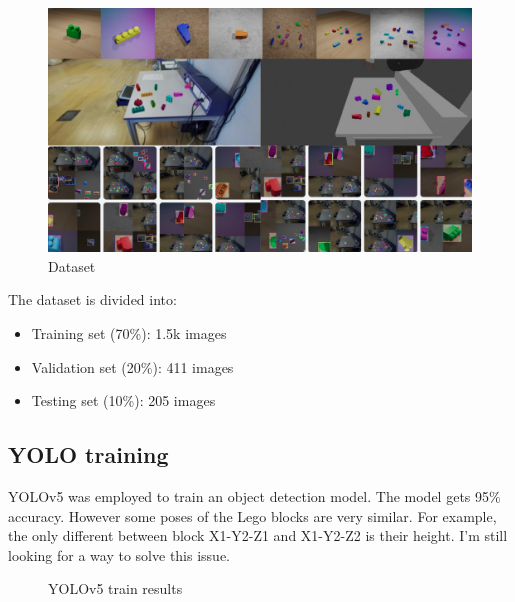 \documentclass{article}
\begin{document}
	\begin{figure}[H]
		\centering
		\includegraphics[width=1.0\textwidth]{dataset.png}
		\caption{Dataset}
		\label{fig:dataset}
	\end{figure}
	
	The dataset is divided into:
	\begin{itemize}
		\item Training set (70\%): 1.5k images
		\item Validation set (20\%): 411 images
		\item Testing set (10\%): 205 images
	\end{itemize}
	
	\subsection{YOLO training}
	YOLOv5 was employed to train an object detection model. The model gets 95\% accuracy. However some poses of the Lego blocks are very similar. For example, the only different between block X1-Y2-Z1 and X1-Y2-Z2 is their height. I'm still looking for a way to solve this issue.
	
	\begin{figure}[H]
		\centering
		\caption{YOLOv5 train results}
		\label{fig:train_results}
	\end{figure}
	
\end{document}
